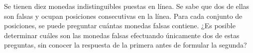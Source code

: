 Se tienen diez monedas indistinguibles puestas en línea. Se sabe que dos de ellas son falsas y ocupan posiciones consecutivas en la línea. Para cada conjunto de posiciones, se puede preguntar cuántas monedas falsas contiene. ¿Es posible determinar cuáles son las monedas falsas efectuando únicamente dos de estas preguntas, sin conocer la respuesta de la primera antes de formular la segunda?
